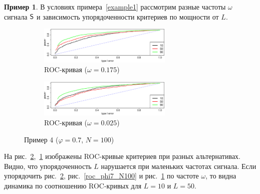 \documentclass[specialist,
substylefile = spbu_report.rtx,
subf,href,colorlinks=true, 12pt]{disser}
\theoremstyle{definition}
\newtheorem{example}{Пример}
\begin{document}
\begin{example}
	В условиях примера~\ref{example1} рассмотрим разные частоты $\omega$ сигнала $\mathsf{S}$ и зависимость упорядоченности критериев по мощности от $L$. 
	\begin{figure}[h!]
		\captionsetup[subfigure]{justification=Centering}
		\begin{subfigure}[t]{\textwidth}
			\centering
			\includegraphics[width=0.7\textwidth]{../cps2024/images/roc_omega0175.eps}
			\caption{ROC-кривая ($\omega=0.175$)}
			\label{roc_omega0025}
		\end{subfigure}
		\begin{subfigure}[t]{\textwidth}
			\centering
			\includegraphics[width=0.7\textwidth]{../cps2024/images/roc_omega0025.eps}
			\caption{ROC-кривая ($\omega=0.025$)}
			\label{roc_omega0175}
		\end{subfigure}
	\label{fig:example4}
	\caption{Пример 4 ($\varphi=0.7$, $N=100$)}
	\end{figure}
	На рис.~\ref{roc_omega0175},~\ref{roc_omega0025} изображены ROC-кривые критериев при разных альтернативах. Видно, что упорядоченность $L$ нарушается при маленьких частотах сигнала. Если упорядочить рис.~\ref{roc_omega0175}, рис.~\ref{roc_phi7_N100} и рис.~\ref{roc_omega0025} по частоте $\omega$, то видна динамика по соотношению ROC-кривых для $L=10$ и $L=50$.
\end{example}
\end{document}
